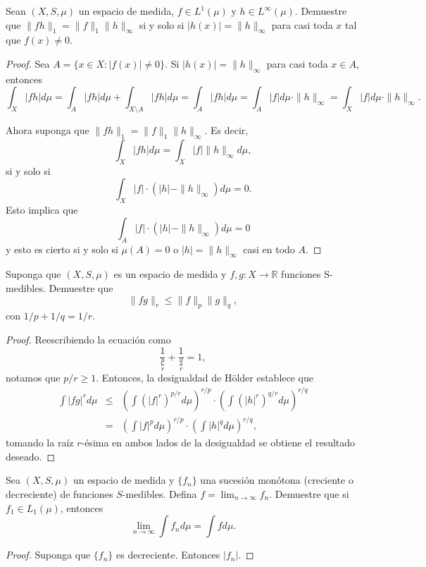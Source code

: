 \documentclass[12pt]{article}
\newcommand{\R}{\mathbb{R}}
\newenvironment{problem}[2][Problema]{\begin{trivlist}
\item[\hskip \labelsep {\bfseries #1}\hskip \labelsep {\bfseries #2.}]}{\end{trivlist}}
\begin{document}
\begin{problem}{25} Sean $(X, S, \mu)$ un espacio de medida, $f\in L^1(\mu)$ y $h \in  L^\infty(\mu)$. Demuestre que 
$\| fh \|_1 = \| f \|_1 \| h \|_\infty$ si y solo si $| h (x) | = \| h \|_\infty$ para casi toda $x$ tal que $f(x) \neq 0.$
\end{problem}
\begin{proof}
    Sea $A = \{ x \in X: | f(x) | \neq 0 \}$. Si $| h (x) | = \| h \|_\infty$ para casi toda $x\in A$, entonces
    $$\int_X | f h | d\mu  = \int_A |fh | d\mu + \int_{X\setminus A} | fh | d \mu = \int_A |fh | d\mu  = \int_A | f | d\mu \cdot \| h \|_\infty = \int_X | f | d\mu \cdot \| h \|_\infty.$$

    Ahora suponga que $\| fh \|_1 = \| f \|_1 \| h \|_\infty$. Es decir,
    $$\int_X | fh | d \mu = \int_X | f | \| h \|_\infty d \mu,$$
    si y solo si 
    $$\int_X | f | \cdot (| h | - \| h \|_\infty)  d \mu = 0.$$
    Esto implica que
    $$\int_A | f | \cdot (| h | - \| h \|_\infty)  d \mu = 0$$ y esto
    es cierto si y solo si $\mu(A) = 0$ o $\lvert h \rvert  = \| h \|_\infty$ casi en todo $A$.
\end{proof}


\begin{problem}{26} Suponga que $(X, S, \mu)$ es un espacio de medida y $f,g: X \rightarrow \R$ funciones S-medibles. Demuestre que 
$$\| f g \|_r \leq \| f \|_p \| g \|_q,$$
con $1/p + 1/q = 1/r.$
\end{problem}
\begin{proof} Reescribiendo la ecuación como 
$$\frac{1}{\frac{p}{r}} + \frac{1}{\frac{q}{r}} = 1,$$
notamos que $p / r \geq 1$. Entonces, la desigualdad de Hölder establece que 
    \begin{eqnarray*}
        \int | fg |^r d \mu &\leq& \left(\int (| f|^r)^{p/r}  d \mu \right)^{r/p} \cdot \left( \int (| h |^r)^{q/r} d \mu \right)^{r/q}\\
        &=& \left(\int  | f|^p  d \mu \right)^{r/p} \cdot \left( \int | h |^q d \mu \right)^{r/q},
    \end{eqnarray*}
tomando la raíz $r$-ésima en ambos lados de la desigualdad se obtiene el resultado deseado.
\end{proof}


\begin{problem}{27} Sea $(X, S, \mu)$ un espacio de medida y $\{f_n\}$ una sucesión monótona (creciente o decreciente) de funciones $S$-medibles. Defina $f = \lim_{n \to \infty} f_n$. Demuestre que si 
$f_1 \in L_1(\mu)$, entonces
$$\lim_{n \to \infty} \int f_n d\mu  = \int f d\mu.$$
\end{problem}
\begin{proof}
Suponga que $\{f_n\}$ es decreciente. Entonces $\lvert f_n \rvert.$

\end{proof}
\end{document}
